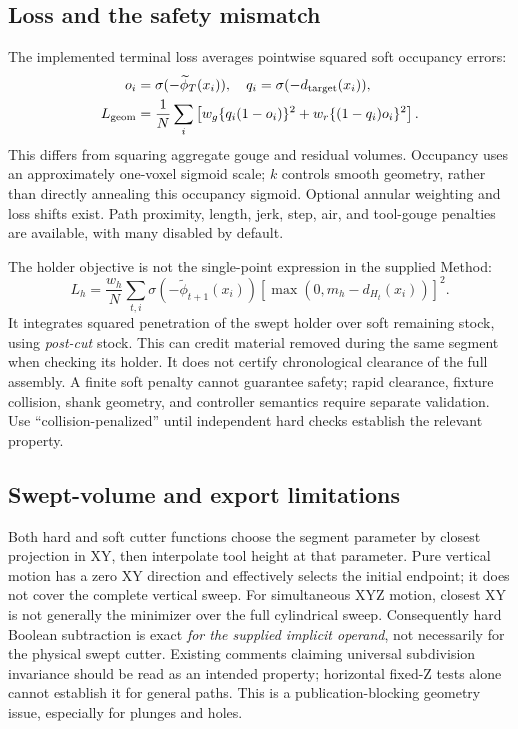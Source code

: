 \documentclass[11pt]{article}
\begin{document}
\subsection{Loss and the safety mismatch}
The implemented terminal loss averages pointwise squared soft occupancy errors:
\begin{align}
 o_i&=\sigma(-\widetilde\phi_T(x_i)),\quad q_i=\sigma(-d_{\rm target}(x_i)),\\
 L_{\rm geom}&=\frac1N\sum_i\left[
 w_g\{q_i(1-o_i)\}^2+w_r\{(1-q_i)o_i\}^2\right].
\end{align}
This differs from squaring aggregate gouge and residual volumes. Occupancy uses
an approximately one-voxel sigmoid scale; $k$ controls smooth geometry, rather
than directly annealing this occupancy sigmoid. Optional annular weighting and
loss shifts exist. Path proximity, length, jerk, step, air, and tool-gouge
penalties are available, with many disabled by default.

The holder objective is not the single-point expression in the supplied Method:
\begin{equation}
 L_h=\frac{w_h}{N}\sum_{t,i}\sigma(-\widetilde\phi_{t+1}(x_i))
 [\max(0,m_h-d_{H_t}(x_i))]^2.
\end{equation}
It integrates squared penetration of the swept holder over soft remaining
stock, using \emph{post-cut} stock. This can credit material removed during the
same segment when checking its holder. It does not certify chronological
clearance of the full assembly. A finite soft penalty cannot guarantee safety;
rapid clearance, fixture collision, shank geometry, and controller semantics
require separate validation. Use ``collision-penalized'' until independent hard
checks establish the relevant property.

\subsection{Swept-volume and export limitations}
Both hard and soft cutter functions choose the segment parameter by closest
projection in XY, then interpolate tool height at that parameter. Pure vertical
motion has a zero XY direction and effectively selects the initial endpoint;
it does not cover the complete vertical sweep. For simultaneous XYZ motion,
closest XY is not generally the minimizer over the full cylindrical sweep.
Consequently hard Boolean subtraction is exact \emph{for the supplied implicit
operand}, not necessarily for the physical swept cutter. Existing comments
claiming universal subdivision invariance should be read as an intended
property; horizontal fixed-Z tests alone cannot establish it for general paths.
This is a publication-blocking geometry issue, especially for plunges and holes.
\end{document}
